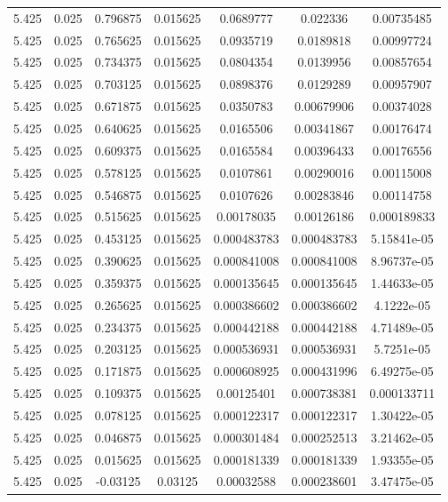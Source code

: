 \begin{flushleft}
\begin{longtable}{ccccccc}
5.425 & 0.025 & 0.796875 & 0.015625 & 0.0689777 & 0.022336 & 0.00735485  \\ 
5.425 & 0.025 & 0.765625 & 0.015625 & 0.0935719 & 0.0189818 & 0.00997724  \\ 
5.425 & 0.025 & 0.734375 & 0.015625 & 0.0804354 & 0.0139956 & 0.00857654  \\ 
5.425 & 0.025 & 0.703125 & 0.015625 & 0.0898376 & 0.0129289 & 0.00957907  \\ 
5.425 & 0.025 & 0.671875 & 0.015625 & 0.0350783 & 0.00679906 & 0.00374028  \\ 
5.425 & 0.025 & 0.640625 & 0.015625 & 0.0165506 & 0.00341867 & 0.00176474  \\ 
5.425 & 0.025 & 0.609375 & 0.015625 & 0.0165584 & 0.00396433 & 0.00176556  \\ 
5.425 & 0.025 & 0.578125 & 0.015625 & 0.0107861 & 0.00290016 & 0.00115008  \\ 
5.425 & 0.025 & 0.546875 & 0.015625 & 0.0107626 & 0.00283846 & 0.00114758  \\ 
5.425 & 0.025 & 0.515625 & 0.015625 & 0.00178035 & 0.00126186 & 0.000189833  \\ 
5.425 & 0.025 & 0.453125 & 0.015625 & 0.000483783 & 0.000483783 & 5.15841e-05  \\ 
5.425 & 0.025 & 0.390625 & 0.015625 & 0.000841008 & 0.000841008 & 8.96737e-05  \\ 
5.425 & 0.025 & 0.359375 & 0.015625 & 0.000135645 & 0.000135645 & 1.44633e-05  \\ 
5.425 & 0.025 & 0.265625 & 0.015625 & 0.000386602 & 0.000386602 & 4.1222e-05  \\ 
5.425 & 0.025 & 0.234375 & 0.015625 & 0.000442188 & 0.000442188 & 4.71489e-05  \\ 
5.425 & 0.025 & 0.203125 & 0.015625 & 0.000536931 & 0.000536931 & 5.7251e-05  \\ 
5.425 & 0.025 & 0.171875 & 0.015625 & 0.000608925 & 0.000431996 & 6.49275e-05  \\ 
5.425 & 0.025 & 0.109375 & 0.015625 & 0.00125401 & 0.000738381 & 0.000133711  \\ 
5.425 & 0.025 & 0.078125 & 0.015625 & 0.000122317 & 0.000122317 & 1.30422e-05  \\ 
5.425 & 0.025 & 0.046875 & 0.015625 & 0.000301484 & 0.000252513 & 3.21462e-05  \\ 
5.425 & 0.025 & 0.015625 & 0.015625 & 0.000181339 & 0.000181339 & 1.93355e-05  \\ 
5.425 & 0.025 & -0.03125 & 0.03125 & 0.00032588 & 0.000238601 & 3.47475e-05  \\ 

\end{longtable}
\end{flushleft}
